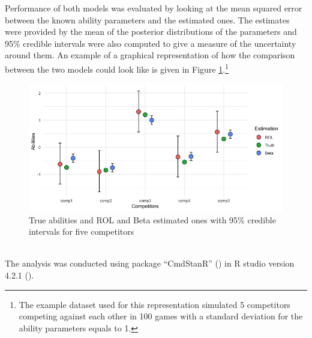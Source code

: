 Performance of both models was evaluated by looking at the mean squared error between the known ability parameters and the estimated ones. The estimates were provided by the mean of the posterior distributions of the parameters and 95\% credible intervals were also computed  to give a measure of the uncertainty around them. An example of a graphical representation of how the comparison between the two models could look like is given in Figure \ref{fig: ROL, Beta and true ability parameters for five competitors}.\footnote{The example dataset used for this representation simulated 5 competitors competing against each other in 100 games with a standard deviation for the ability parameters equals to 1.}\\
\begin{figure}[h]
\centering
\includegraphics[scale=0.5]{images/Rplot01.jpeg}
\caption{True abilities and ROL and Beta estimated ones with 95\% credible intervals for five competitors}
\label{fig: ROL, Beta and true ability parameters for five competitors}
\end{figure}
\\
The analysis was conducted using package “CmdStanR” (\cite{gabry2021cmdstanr}) in R studio version 4.2.1 (\cite{posit2023rstudio}).
